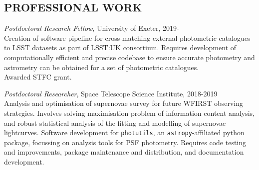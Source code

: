 \documentclass[letter, margin, 10pt]{res} %
\begin{document}
\begin{resume}

 



\section{PROFESSIONAL WORK}

{\sl Postdoctoral Research Fellow}, University of Exeter, 2019-\\
Creation of software pipeline for cross-matching external photometric catalogues to LSST datasets as part of LSST:UK consortium. Requires development of computationally efficient and precise codebase to ensure accurate photometry and astrometry can be obtained for a set of photometric catalogues. \\Awarded STFC grant.

{\sl Postdoctoral Researcher}, Space Telescope Science Institute, 2018-2019\\
Analysis and optimisation of supernovae survey for future WFIRST observing strategies. Involves solving maximisation problem of information content analysis, and robust statistical analysis of the fitting and modelling of supernovae lightcurves. Software development for \texttt{photutils}, an \texttt{astropy}-affiliated python package, focussing on analysis tools for PSF photometry. Requires code testing and improvements, package maintenance and distribution, and documentation development.


\end{resume}
\end{document}
